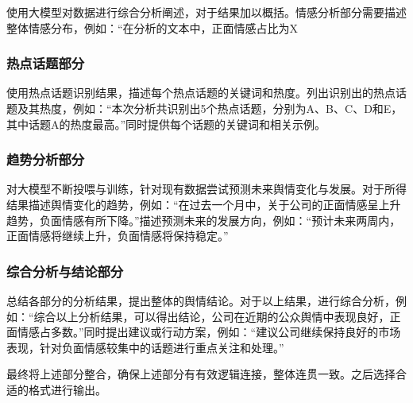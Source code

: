 \documentclass[UTF8,a4paper,15pt,titlepage,oneside]{ctexbook}
\begin{document}
使用大模型对数据进行综合分析阐述，对于结果加以概括。情感分析部分需要描述整体情感分布，例如：“在分析的文本中，正面情感占比为X%

\subsubsection{热点话题部分}

使用热点话题识别结果，描述每个热点话题的关键词和热度。列出识别出的热点话题及其热度，例如：“本次分析共识别出5个热点话题，分别为A、B、C、D和E，其中话题A的热度最高。”同时提供每个话题的关键词和相关示例。

\subsubsection{趋势分析部分}
对大模型不断投喂与训练，针对现有数据尝试预测未来舆情变化与发展。对于所得结果描述舆情变化的趋势，例如：“在过去一个月中，关于公司的正面情感呈上升趋势，负面情感有所下降。”描述预测未来的发展方向，例如：“预计未来两周内，正面情感将继续上升，负面情感将保持稳定。”

\subsubsection{综合分析与结论部分}

总结各部分的分析结果，提出整体的舆情结论。对于以上结果，进行综合分析，例如：“综合以上分析结果，可以得出结论，公司在近期的公众舆情中表现良好，正面情感占多数。”同时提出建议或行动方案，例如：“建议公司继续保持良好的市场表现，针对负面情感较集中的话题进行重点关注和处理。”

最终将上述部分整合，确保上述部分有有效逻辑连接，整体连贯一致。之后选择合适的格式进行输出。
\end{document}
